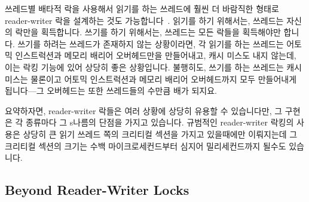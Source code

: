 쓰레드별 배타적 락을 사용해서 읽기를 하는 쓰레드에 훨씬 더 바람직한 형태로
reader-writer 락을 설계하는 것도 가능합니다~\cite{WilsonCHsieh92a}.
읽기를 하기 위해서는, 쓰레드는 자신의 락만을 획득합니다.
쓰기를 하기 위해서는, 쓰레드는 모든 락들을 획득해야만 합니다.
쓰기를 하려는 쓰레드가 존재하지 않는 상황이라면, 각 읽기를 하는 쓰레드는 어토믹
인스트럭션과 메모리 배리어 오버헤드만을 만들어내고, 캐시 미스도 내지 않는데,
이는 락킹 기능에 있어 상당히 좋은 상황입니다.
불행히도, 쓰기를 하는 쓰레드는 캐시 미스는 물론이고 어토믹 인스트럭션과 메모리
배리어 오버헤드까지 모두 만들어내게 됩니다---그 오버헤드는 또한 쓰레드들의
수만큼 배가 되지요.

요약하자면, reader-writer 락들은 여러 상황에 상당히 유용할 수 있습니다만, 그
구현은 각 종류마다 그 s나름의 단점을 가지고 있습니다.
규범적인 reader-writer 락킹의 사용은 상당히 큰 읽기 쓰레드 쪽의 크리티컬 섹션을
가지고 있을때에만 이뤄지는데 그 크리티컬 섹션의 크기는 수백 마이크로세컨드부터
심지어 밀리세컨드까지 될수도 있습니다.

\subsection{Beyond Reader-Writer Locks}
\label{sec:locking:Beyond Reader-Writer Locks}

